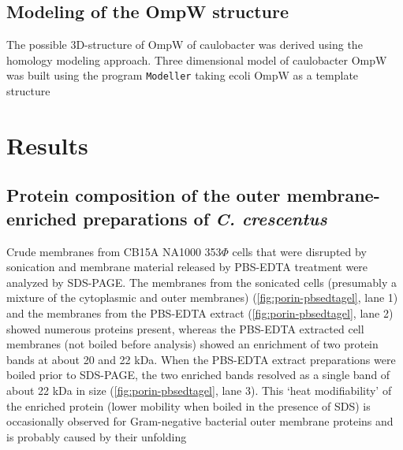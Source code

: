 \subsection{Modeling of the OmpW structure}
\label{sub:porin_modeling}
The possible 3D-structure of OmpW of \ac{caulobacter} was derived using the homology modeling approach. Three dimensional model of \ac{caulobacter} OmpW was built using the program \texttt{Modeller} taking \ac{ecoli} OmpW as a template structure
 
\section{Results}

\subsection{Protein composition of the outer membrane-enriched  preparations of \textit{C. crescentus}}
Crude membranes from \caulobacter CB15A NA1000 353$\Phi$ cells that were disrupted by sonication and membrane material released by \ac{PBS}-\ac{EDTA} treatment were analyzed by \ac{SDS-PAGE}. The membranes from the sonicated cells (presumably a mixture of the cytoplasmic and outer membranes) (\cref{fig:porin-pbsedtagel}, lane 1) and the membranes from the \ac{PBS}-\ac{EDTA} extract (\cref{fig:porin-pbsedtagel}, lane 2) showed numerous proteins present, whereas the \ac{PBS}-\ac{EDTA} extracted cell membranes (not boiled before analysis) showed an enrichment of two protein bands at about 20 and 22 kDa. When the \ac{PBS}-\ac{EDTA} extract preparations were boiled prior to \ac{SDS-PAGE}, the two enriched bands resolved as a single band of about 22 kDa in size (\cref{fig:porin-pbsedtagel}, lane 3). This `heat modifiability' of the enriched protein (\ie lower mobility when boiled in the presence of \textsc{SDS}) is occasionally observed for Gram-negative bacterial outer membrane proteins and is probably caused by their unfolding

